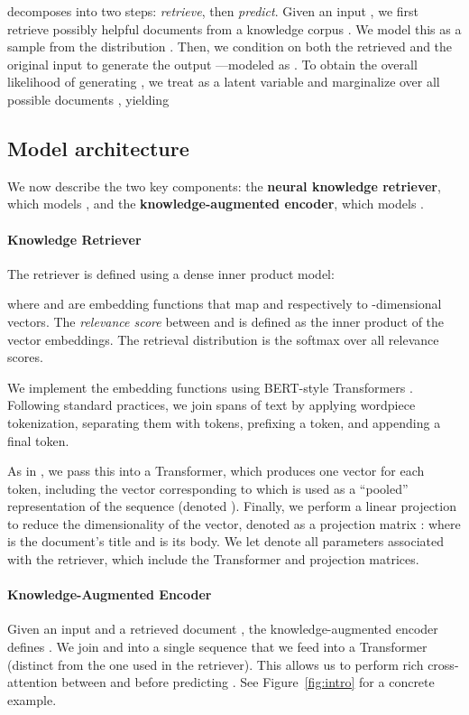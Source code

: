 \documentclass{article}
\begin{document}
\thename decomposes  into two steps: {\em retrieve}, then {\em predict}. Given an input , we first retrieve possibly helpful documents  from a knowledge corpus . We model this as a sample from the distribution . Then, we condition on both the retrieved  and the original input  to generate the output ---modeled as . To obtain the overall likelihood of generating , we treat  as a latent variable and marginalize over all possible documents , yielding 

\subsection{Model architecture}
\label{sec:model_architecture}
We now describe the two key components: the \textbf{neural knowledge retriever}, which models , and the \textbf{knowledge-augmented encoder}, which models .

\paragraph{Knowledge Retriever}
The retriever is defined using a dense inner product model:

where  and  are embedding
functions that map  and  respectively to -dimensional vectors.
The \emph{relevance score}  between  and  is defined as the inner product of the vector embeddings.
The retrieval distribution is the softmax over all relevance scores.

We implement the embedding functions using BERT-style Transformers \cite{bert}. Following standard practices, we join spans of text by applying wordpiece tokenization, separating them with  tokens, prefixing a  token, and appending a final  token.

As in \citet{bert}, we pass this into a Transformer, which produces one vector for each token, including the vector corresponding to  which is used as a ``pooled'' representation of the sequence (denoted ). Finally, we perform a linear projection to reduce the dimensionality of the vector, denoted as a projection matrix :
where  is the document's title and  is its body.
We let  denote all parameters associated with the retriever, which include the Transformer and projection matrices.

\paragraph{Knowledge-Augmented Encoder}
Given an input  and a retrieved document , the knowledge-augmented encoder defines . We join  and  into a single sequence that we feed into a Transformer (distinct from the one used in the retriever). This allows us to perform rich cross-attention between  and  before predicting . See Figure~\ref{fig:intro} for a concrete example.
\end{document}
